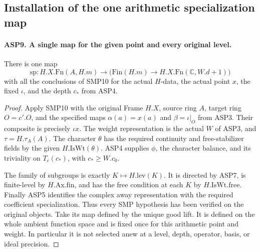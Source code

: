 \subsection{Installation of the one arithmetic specialization map}

\paragraph{ASP9. A single map for the given point and every original level.}
\label{claim:ASP9}
There is one map
\begin{equation}\label{eq:asp-map}
 \mathrm{sp}:H.X.\mathrm{Fn}(A,H.m)\longrightarrow
              \bigl(\mathrm{Fin}(H.m)\to
                              H.X.\mathrm{Fn}(\mathbb C,W.d+1)\bigr)
\end{equation}
with all the conclusions of SMP10 for the actual
$H$-data, the actual point $x$, the fixed $\iota$,
and the depth $c_*$ from ASP4.
\begin{proof}
Apply SMP10 with the original Frame $H.X$,
source ring $A$, target ring $O=c'.O$, and the
specified maps
$\alpha(a)=x(a)$ and $\beta=\iota|_O$ from ASP3.
Their composite is precisely $\iota x$.
The weight representation is the actual $W$
of ASP3, and $\tau=H.\tau_A(A)$.
The character $\theta$ has the required
continuity and free-stabilizer fields by the
given $H.\mathrm{IsWt}(\theta)$.
ASP4 supplies $\phi$, the character balance,
and its triviality on $T_c(c_*)$, with
$c_*\geq W.c_0$.

The family of subgroups is exactly
$K\mapsto H.\mathrm{lev}(K)$.  It is directed
by ASP7, is finite-level by $H.\mathrm{Ax}.\mathrm{fin}$,
and has the free condition at each $K$ by
$H.\mathrm{IsWt}.\mathrm{free}$.
Finally ASP5 identifies the complex away
representation with the required coefficient
specialization.  Thus every SMP hypothesis
has been verified on the original objects.
Take its map defined by the unique good lift.
It is defined on the whole ambient function
space and is fixed once for this arithmetic
point and weight.  In particular it is not
selected anew at a level, depth, operator,
basis, or ideal precision.
\end{proof}

